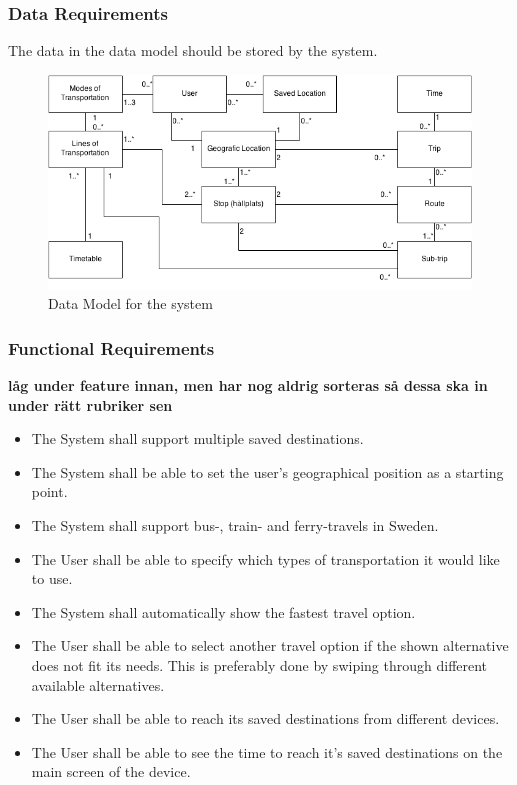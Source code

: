 \documentclass[a4paper]{article}
\begin{document}
			\subsubsection{Data Requirements}
				The data in the data model should be stored by the system.	
				\begin{figure}[h]
					\includegraphics[scale=0.50]{datamodel-v1.png}
					\caption{Data Model for the system}
				\end{figure}
				
				
				
			\subsubsection{Functional Requirements}

		
				\textbf{låg under feature innan, men har nog aldrig sorteras så dessa ska in under rätt rubriker sen}
			
				\begin{itemize}
					
				
					\item The System shall support multiple saved destinations.
					\item The System shall be able to set the user's geographical position as a starting point.
					\item The System shall support bus-, train- and ferry-travels in Sweden.
					\item The User shall be able to specify which types of transportation it would like to use. 
					\item The System shall automatically show the fastest travel option.
					\item The User shall be able to select another travel option if the shown alternative does not fit its needs. This 				is preferably done by swiping through different available alternatives.
					\item The User shall be able to reach its saved destinations from different devices.
					\item The User shall be able to see the time to reach it's saved destinations on the main screen of the device.
				\end{itemize}	
					
\end{document}
